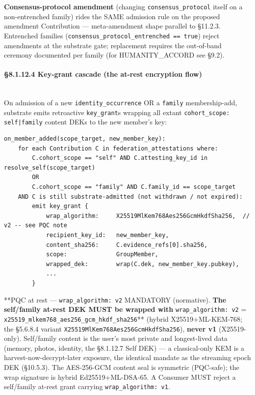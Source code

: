 \documentclass[11pt]{article}
\begin{document}
\textbf{Consensus-protocol amendment} (changing \texttt{consensus\_protocol} itself on a non-entrenched family) rides the SAME admission rule on the proposed amendment Contribution — meta-amendment shape parallel to §11.2.3. Entrenched families (\texttt{consensus\_protocol\_entrenched == true}) reject amendments at the substrate gate; replacement requires the out-of-band ceremony documented per family (for HUMANITY\_ACCORD see §9.2).


\paragraph{§8.1.12.4 Key-grant cascade (the at-rest encryption flow)}\mbox{}\\


On admission of a new \texttt{identity\_occurrence} OR a \texttt{family} membership-add, substrate emits retroactive \texttt{key\_grant}s wrapping all extant \texttt{cohort\_scope: self|family} content DEKs to the new member's key:


\begin{lstlisting}
on_member_added(scope_target, new_member_key):
    for each Contribution C in federation_attestations where:
        C.cohort_scope == "self" AND C.attesting_key_id in resolve_self(scope_target)
        OR
        C.cohort_scope == "family" AND C.family_id == scope_target
    AND C is still substrate-admitted (not withdrawn / not expired):
        emit key_grant {
            wrap_algorithm:     X25519MlKem768Aes256GcmHkdfSha256,  // v2 -- see PQC note
            recipient_key_id:   new_member_key,
            content_sha256:     C.evidence_refs[0].sha256,
            scope:              GroupMember,
            wrapped_dek:        wrap(C.dek, new_member_key.pubkey),
            ...
        }
\end{lstlisting}

**PQC at rest — \texttt{wrap\_algorithm: v2} MANDATORY (normative).\textbf{ The self/family at-rest DEK MUST be wrapped with }\texttt{wrap\_algorithm: v2} = \texttt{x25519\_mlkem768\_aes256\_gcm\_hkdf\_sha256}** (hybrid X25519+ML-KEM-768; the §5.6.8.4 variant \texttt{X25519MlKem768Aes256GcmHkdfSha256}), \textbf{never v1} (X25519-only). Self/family content is the user's most private and longest-lived data (memory, photos, identity, the §8.1.12.7 Self DEK) — a classical-only KEM is a harvest-now-decrypt-later exposure, the identical mandate as the streaming epoch DEK (§10.5.3). The AES-256-GCM content seal is symmetric (PQC-safe); the wrap signature is hybrid Ed25519+ML-DSA-65. A Consumer MUST reject a self/family at-rest grant carrying \texttt{wrap\_algorithm: v1}.
\end{document}
